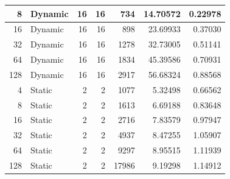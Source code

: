 \documentclass[journal,transmag]{IEEEtran}
\begin{document}
\begin{table}[h]
\begin{tabular}{|r|l|r|r|r|r|r|}
		8                             & Dynamic  & 16                         & 16                         & 734                            & 14.70572                      & 0.22978                         \\ \hline
		16                            & Dynamic  & 16                         & 16                         & 898                            & 23.69933                      & 0.37030                         \\ \hline
		32                            & Dynamic  & 16                         & 16                         & 1278                           & 32.73005                      & 0.51141                         \\ \hline
		64                            & Dynamic  & 16                         & 16                         & 1834                           & 45.39586                      & 0.70931                         \\ \hline
		128                           & Dynamic  & 16                         & 16                         & 2917                           & 56.68324                      & 0.88568                         \\ \hline
		4                             & Static   & 2                          & 2                          & 1077                           & 5.32498                       & 0.66562                         \\ \hline
		8                             & Static   & 2                          & 2                          & 1613                           & 6.69188                       & 0.83648                         \\ \hline
		16                            & Static   & 2                          & 2                          & 2716                           & 7.83579                       & 0.97947                         \\ \hline
		32                            & Static   & 2                          & 2                          & 4937                           & 8.47255                       & 1.05907                         \\ \hline
		64                            & Static   & 2                          & 2                          & 9297                           & 8.95515                       & 1.11939                         \\ \hline
		128                           & Static   & 2                          & 2                          & 17986                          & 9.19298                       & 1.14912                         \\ \hline

\end{tabular}
\end{table}
\end{document}
